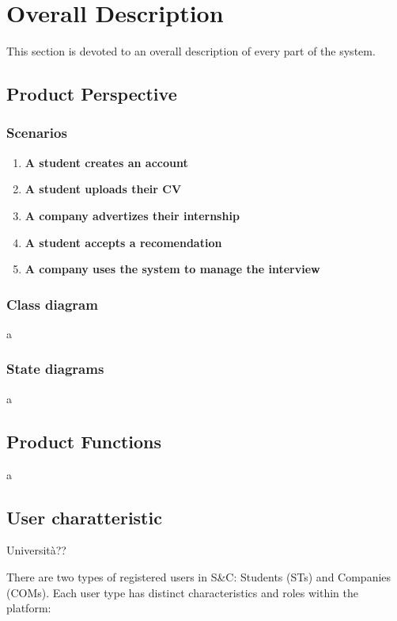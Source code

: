 \chapter{Overall Description}
This section is devoted to an overall description of every part of the system.

\section{Product Perspective}
\subsection{Scenarios}

\begin{enumerate}
    \item \textbf{A student creates an account}
    \item \textbf{A student uploads their CV}
    \item \textbf{A company advertizes their internship}
    \item \textbf{A student accepts a recomendation}
    \item \textbf{A company uses the system to manage the interview}
\end{enumerate}


\subsection{Class diagram}
a

\subsection{State diagrams}
a

\section{Product Functions}
a


\section{User charatteristic}

Università??

There are two types of registered users in S\&C: Students (STs) and Companies (COMs). Each user type has distinct characteristics and roles within the platform:

